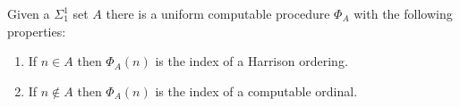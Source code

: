 \documentclass[11pt]{amsart}
\def\H{\mathcal H}
\theoremstyle{remark}
\begin{document}

\begin{proposition}\label{prop:reduct}
Given a $\Sigma_1^1$ set $A$ there is a uniform computable procedure $\Phi_A$ with the following properties:
\begin{enumerate}
	\item If $n\in A$ then $\Phi_A(n)$ is the index of a Harrison ordering.
	\item If $n\not\in A$ then $\Phi_A(n)$ is the index of a computable ordinal.
\end{enumerate}
\end{proposition}


\end{document}
